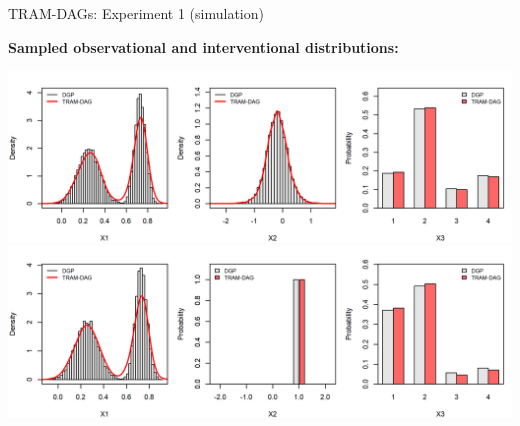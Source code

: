 \documentclass[onlytextwidth,english]{beamer}\usepackage[]{graphicx}\usepackage[]{xcolor}
\begin{document}
% 
% 
% 
% 
% 
% 
% 



\begin{frame}{TRAM-DAGs: Experiment 1 (simulation)}

\textbf{Sampled observational and interventional distributions:}

  \centering
  \includegraphics[width=0.85\linewidth]{img/experiment1/exp1_observational_distribution.png}
  \includegraphics[width=0.85\linewidth]{img/experiment1/exp1_interventional_distribution.png}

\end{frame}

% 
% 
% 
% 
% 
% 
% 
% 
% 
\end{document}
